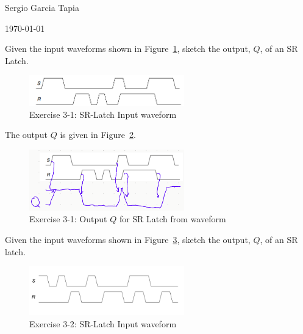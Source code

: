 \documentclass[12pt]{article}
\newenvironment{ex}[2][Exercise]{\begin{trivlist}
		\item[\hskip \labelsep {\bfseries #1}\hskip \labelsep {\bfseries #2.}]}{\end{trivlist}}
\newenvironment{sol}[1][Solution]{\begin{trivlist}
		\item[\hskip \labelsep {\bfseries #1:}]}{\end{trivlist}}
\begin{document}

\noindent Sergio Garcia Tapia \hfill

 \hfill

 \hfill 

\noindent\today

\begin{ex}{3.1}
	Given the input waveforms shown in Figure~\ref{03-01-input-waveform},
	sketch the output, $Q$, of an SR Latch.
	\begin{figure}[h]
		\centering
		\includegraphics[width=0.6\textwidth]{03-01-input-waveform}
		\caption{Exercise 3-1: SR-Latch Input waveform}
		\label{03-01-input-waveform}
	\end{figure}
\end{ex}

\begin{sol}
	The output $Q$ is given in Figure~\ref{03-01-sr-latch-output}.
	\begin{figure}[h]
		\centering
		\includegraphics[width=0.6\textwidth]{03-01-sr-latch-output}
		\caption{Exercise 3-1: Output $Q$ for SR Latch from waveform}
		\label{03-01-sr-latch-output}
	\end{figure}
\end{sol}

\begin{ex}{3-2}
	Given the input waveforms shown in Figure~\ref{03-02-input-waveform}, sketch the output, $Q$, of an SR latch.
	\begin{figure}[h]
		\centering
		\includegraphics[width=0.6\textwidth]{03-02-input-waveform}
		\caption{Exercise 3-2: SR-Latch Input waveform}
		\label{03-02-input-waveform}
	\end{figure}
\end{ex}
\end{document}
